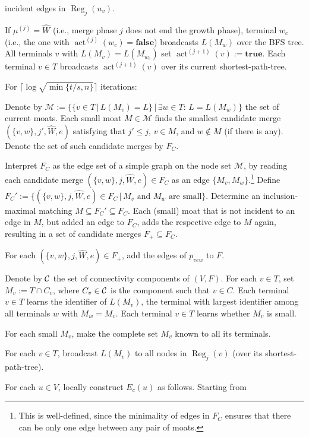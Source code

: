 \documentclass[letterpaper,11pt]{article}
\newcommand{\M}{\mathcal{M}}
\DeclareMathOperator{\act}{act}
\DeclareMathOperator{\reg}{Reg}
\newcommand{\true}{\mathbf{true}}
\newcommand{\false}{\mathbf{false}}
\begin{document}
\begin{compactenum}
\begin{compactenum}
\begin{compactenum}
incident edges in $\reg_j(u_v)$.
\item If $\mu^{(j)}=\hat{W}$ (i.e., merge phase $j$ does not end the growth
phase), terminal $w_c$ (i.e., the one with $\act^{(j)}(w_c)=\false$) broadcasts
$L(M_w)$ over the BFS tree. All terminals $v$ with $L(M_v)=L(M_{w_c})$ set
$\act^{(j+1)}(v):=\true$. Each terminal $v\in T$ broadcasts $\act^{(j+1)}(v)$ over
its current shortest-path-tree.
\end{compactenum}
\item For $\lceil\log \sqrt{\min\{t/s,n\}}\rceil$ iterations:
\begin{compactenum}
\item Denote by $\M:=\{\{v\in T\,|\,L(M_v)=L\}\,|\,\exists w\in T:\,L=L(M_w)\}$
the set of current moats. Each small moat $M\in \M$ finds the smallest
candidate merge $(\{v,w\},j',\hat{W},e)$ satisfying that $j'\leq j$, $v\in
M$, and $w\notin M$ (if there is any). Denote the set of such candidate merges
by $F_C$.
\item Interpret $F_C$ as the edge set of a simple graph on the node set $\M$, by
reading each candidate merge $(\{v,w\},j,\hat{W},e)\in F_C$ as an edge
$\{M_v,M_w\}$.\footnote{This is well-defined, since the minimality of edges in
$F_C$ ensures that there can be only one edge between any pair of moats.}
Define $F_C':=\{(\{v,w\},j,\hat{W},e)\in F_C\,|\,\mbox{$M_v$ and $M_w$ are
small}\}$. Determine an inclusion-maximal matching $M\subseteq F_C'\subseteq
F_C$. Each (small) moat that is not incident to an edge in $M$, but added an
edge to $F_C$, adds the respective edge to $M$ again, resulting in a set of
candidate merges $F_+\subseteq F_C$.
\item For each $(\{v,w\},j,\hat{W},e)\in F_+$, add the edges of $p_{vew}$ to
$F$.
\item Denote by ${\cal C}$ the set of connectivity components of $(V,F)$. For
each $v\in T$, set $M_v:=T\cap C_v$, where $C_v\in {\cal C}$ is the component
such that $v\in C$. Each terminal $v\in T$ learns the identifier of $L(M_v)$,
the terminal with largest identifier among all terminals $w$ with $M_w=M_v$.
Each terminal $v\in T$ learns whether $M_v$ is small.
\item For each small $M_v$, make the complete set $M_v$ known to all its
terminals.
\end{compactenum}
\item For each $v\in T$, broadcast $L(M_v)$ to all nodes in $\reg_j(v)$ (over
its shortest-path-tree).
\item For each $u\in V$, locally construct $E_c(u)$ as follows. Starting from

\end{compactenum}
\end{compactenum}
\end{document}
